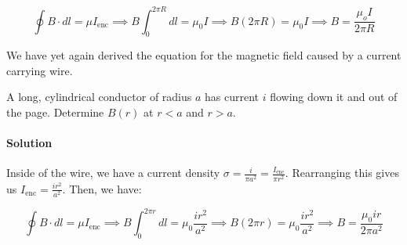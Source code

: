 \documentclass{scrartcl}
\theoremstyle{definition}
\begin{document}
	$$
	\oint B \cdot dl = \mu I_\text{enc} \implies B \int_0^{2\pi R} dl = \mu_0 I \implies B(2\pi R) = \mu_0 I \implies B = \frac{\mu_o I}{2 \pi R}
	$$
	
	\noindent We have yet again derived the equation for the magnetic field caused by a current carrying wire.
	
	\begin{example}
		A long, cylindrical conductor of radius $a$ has current $i$ flowing down it and out of the page. Determine $B(r)$ at $r < a$ and $r > a$.
	\end{example}
	
	\paragraph{Solution} Inside of the wire, we have a current density $\sigma = \frac{i}{\pi a^2} = \frac{I_\text{enc}}{\pi r^2}$. Rearranging this gives us $I_\text{enc} = \frac{ir^2}{a^2}$. Then, we have:
	
	$$
	\oint B \cdot dl = \mu I_\text{enc} \implies B \int_0^{2\pi r} dl = \mu_0 \frac{ir^2}{a^2} \implies B(2\pi r) = \mu_0 \frac{ir^2}{a^2} \implies B = \frac{\mu_0 ir}{2\pi a^2}
	$$
	 	
\end{document}
